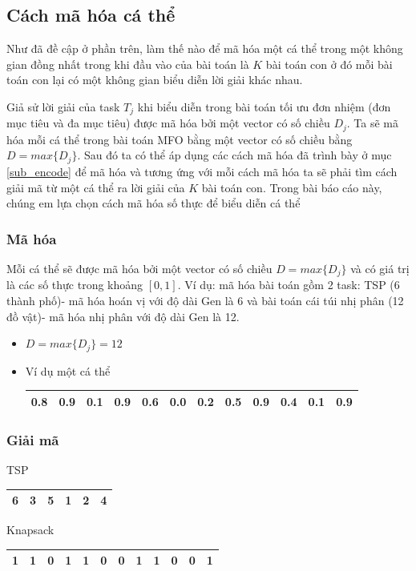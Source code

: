 \documentclass[a4paper,12pt]{report}
\begin{document}
\subsection{Cách mã hóa cá thể}
Như đã đề cập ở phần trên, làm thế nào để mã hóa một cá thể trong một không gian đồng nhất trong khi đầu vào của bài toán là $K$ bài toán con ở đó mỗi bài toán con lại có một không gian biểu diễn lời giải khác nhau.
\par Giả sử lời giải của task $T_j$ khi biểu diễn trong bài toán tối ưu đơn nhiệm (đơn mục tiêu và đa mục tiêu) được mã hóa bởi một vector có số chiều $D_j$. Ta sẽ mã hóa mỗi cá thể trong bài toán MFO bằng một vector có số chiều bằng $D = max\{D_j\}$. Sau đó ta có thể áp dụng các cách mã hóa đã trình bày ở mục \ref{sub_encode}  để mã hóa và tương ứng với mỗi cách mã hóa ta sẽ phải tìm cách giải mã từ một cá thể ra lời giải của $K$ bài toán con. Trong bài báo cáo này, chúng em lựa chọn cách mã hóa số thực để biểu diễn cá thể
\subsubsection{Mã hóa}
Mỗi cá thể sẽ được mã hóa bởi một vector có số chiều $D = max\{D_j\}$ và có giá trị là các số thực trong khoảng $[0,1]$. Ví dụ: mã hóa bài toán gồm 2 task: TSP (6 thành phố)- mã hóa hoán vị với độ dài Gen là 6 và bài toán cái túi nhị phân (12 đồ vật)- mã hóa nhị phân với độ dài Gen là 12.
\begin{itemize}
\item $D = max\{D_j\} = 12$
\item Ví dụ một cá thể 
\begin{longtable}{|c|c|c|c|c|c|c|c|c|c|c|c|}
\hline
0.8 & 0.9 & 0.1 & 0.9 & 0.6 & 0.0 & 0.2 & 0.5 & 0.9 & 0.4 & 0.1 & 0.9\\
\hline
\end{longtable}\end{itemize}

\subsubsection{Giải mã}
TSP
\begin{longtable}{|c|c|c|c|c|c|}
\hline
6& 3& 5& 1& 2& 4\\
\hline
\end{longtable}
Knapsack
\begin{longtable}{|c|c|c|c|c|c|c|c|c|c|c|c|}
\hline
1& 1& 0& 1& 1& 0&0&1&1&0&0&1\\
\hline
\end{longtable}
\end{document}
